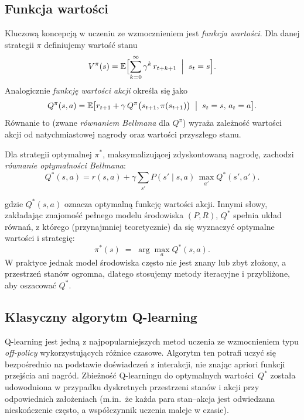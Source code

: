 \documentclass[a4paper,12pt]{article}
\begin{document}
\subsection*{Funkcja wartości}
Kluczową koncepcją w uczeniu ze wzmocznieniem jest \emph{funkcja wartości}. Dla danej strategii \(\pi\) definiujemy wartość stanu
\begin{equation}
V^{\pi}(s)
= \mathbb{E}\Bigl[\sum_{k=0}^\infty \gamma^k\,r_{t+k+1}\;\Bigm|\;s_t=s\Bigr].
\end{equation}
Analogicznie \emph{funkcję wartości akcji} określa się jako
\begin{equation}
Q^{\pi}(s,a)
= \mathbb{E}\bigl[r_{t+1} + \gamma\,Q^{\pi}\bigl(s_{t+1},\pi(s_{t+1})\bigr)\;\bigm|\;s_t=s,\,a_t=a\bigr].
\end{equation}
Równanie to (zwane \emph{równaniem Bellmana} dla \(Q^\pi\)) wyraża zależność wartości akcji od natychmiastowej nagrody oraz wartości przyszłego stanu. 

Dla strategii optymalnej \(\pi^*\), maksymalizującej zdyskontowaną nagrodę, zachodzi \emph{równanie optymalności Bellmana}:
\begin{equation}
Q^*(s,a)
= r(s,a) + \gamma \sum_{s'} P(s'\mid s,a)\,\max_{a'} Q^*(s',a').
\end{equation}

gdzie \(Q^*(s,a)\) oznacza optymalną funkcję wartości akcji. Innymi słowy, zakładając znajomość pełnego modelu środowiska \((P,R)\), \(Q^*\) spełnia układ równań, z którego (przynajmniej teoretycznie) da się wyznaczyć optymalne wartości i strategię:
\begin{equation}
\pi^*(s) \;=\; \arg\max_{a} Q^*(s,a).
\end{equation}
W praktyce jednak model środowiska często nie jest znany lub zbyt złożony, a przestrzeń stanów ogromna, dlatego stosujemy metody iteracyjne i przybliżone, aby oszacować \(Q^*\).

\subsection{Klasyczny algorytm Q-learning}

Q-learning jest jedną z najpopularniejszych metod uczenia ze wzmocnieniem typu \emph{off-policy} wykorzystujących różnice czasowe. Algorytm ten potrafi uczyć się bezpośrednio na podstawie doświadczeń z interakcji, nie znając apriori funkcji przejścia ani nagród. Zbieżność Q-learningu do optymalnych wartości~$Q^*$ została udowodniona w przypadku dyskretnych przestrzeni stanów i akcji przy odpowiednich założeniach (m.in.\ że każda para stan–akcja jest odwiedzana nieskończenie często, a współczynnik uczenia maleje w czasie).
\end{document}
